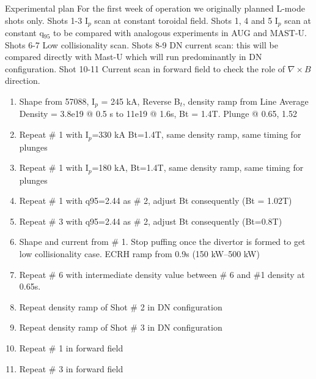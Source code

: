 \documentclass[10pt, compress]{beamer}
\newcommand\Fontvi{\fontsize{8}{7.2}\selectfont}
\begin{document}
\begin{frame}{Experimental plan}
\Fontvi
    \alert{For the first week of operation we originally planned L-mode shots
      only. Shots 1-3 I$_p$ scan at constant toroidal field. Shots
      1, 4 and 5 I$_p$ scan at constant q$_{95}$ to be compared with
      analogous experiments in AUG and MAST-U. Shots 6-7 Low
      collisionality scan. Shots 8-9 DN current scan: this will be
      compared directly with Mast-U which will run predominantly in DN
    configuration. Shot 10-11 Current scan in forward field to check
    the role of $\nabla\times B$ direction.}
\begin{enumerate}
\item Shape from 57088, I$_p$ = 245 kA,  Reverse B$_t$,
    density ramp from Line Average Density = 3.8e19 @ 0.5 s to 11e19 @ 1.6s,  Bt = 1.4T. Plunge @ 0.65, 1.52
\item  Repeat \# 1 with I$_p$=330 kA Bt=1.4T, same density ramp, same timing for plunges
\item  Repeat \# 1 with I$_p$=180 kA, Bt=1.4T, same density ramp, same timing for plunges
\item  Repeat \# 1 with q95=2.44 as \# 2, adjust Bt consequently (Bt = 1.02T)
\item  Repeat \# 3 with q95=2.44 as \# 2, adjust Bt consequently (Bt=0.8T)
\item  Shape and current from \# 1. Stop puffing once the divertor is
  formed to get low collisionality case. ECRH ramp from 0.9s (150
  kW--500 kW)
\item  Repeat \# 6 with intermediate density value between \# 6 and
  \#1 density at 0.65s. 
\item  Repeat density ramp of Shot \# 2 in DN configuration 
\item  Repeat density ramp of Shot \# 3 in DN configuration 
\item Repeat \# 1 in forward field
\item Repeat \# 3 in forward field
\end{enumerate}
\end{frame}
\end{document}
